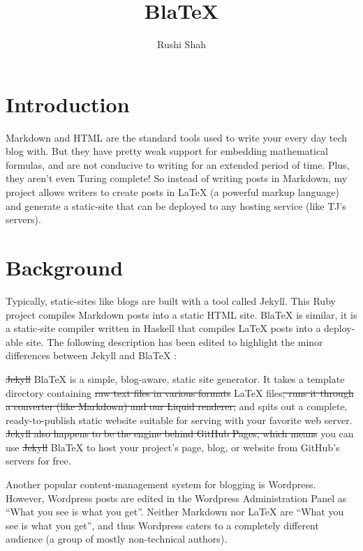 \documentclass[doc,apacite,12pt]{apa6}
\title{BlaTeX}
\author{Rushi Shah}
\affiliation{TJHSST}
\newcommand{\bx}{BlaTeX }
\begin{document}
\maketitle    

         
\section{Introduction}

Markdown and HTML are the standard tools used to write your every day tech blog with. But they have pretty weak support for embedding mathematical formulas, and are not conducive to writing for an extended period of time. Plus, they aren't even Turing complete! So instead of writing posts in Markdown, my project allows writers to create posts in LaTeX (a powerful markup language) and generate a static-site that can be deployed to any hosting service (like TJ's servers).

\section{Background}

Typically, static-sites like blogs are built with a tool called Jekyll. This Ruby project compiles Markdown posts into a static HTML site. \bx is similar, it is a static-site compiler written in Haskell that compiles LaTeX posts into a deploy-able site. The following description has been edited to highlight the minor differences between Jekyll and \bx:

\sout{Jekyll} BlaTeX is a simple, blog-aware, static site generator. It takes a template directory containing \sout{raw text files in various formats} LaTeX files\sout{, runs it through a converter (like Markdown) and our Liquid renderer,} and spits out a complete, ready-to-publish static website suitable for serving with your favorite web server. \sout{Jekyll also happens to be the engine behind GitHub Pages, which means} you can use \sout{Jekyll} BlaTeX to host your project's page, blog, or website from GitHub's servers for free.

Another popular content-management system for blogging is Wordpress. However, Wordpress posts are edited in the Wordpress Administration Panel as ``What you see is what you get''. Neither Markdown nor LaTeX are ``What you see is what you get'', and thus Wordpress caters to a completely different audience (a group of mostly non-technical authors). 
\end{document}
